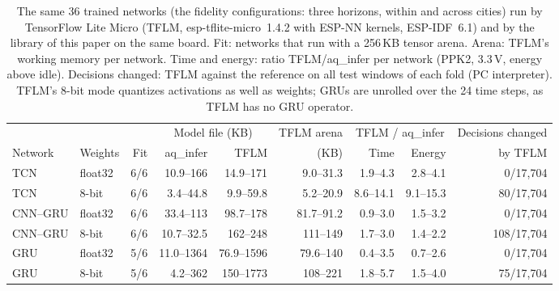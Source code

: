 \begin{table}[t]
\centering
\caption{The same 36 trained networks (the fidelity configurations: three horizons, within and across cities) run by TensorFlow Lite Micro (TFLM, esp-tflite-micro~1.4.2 with ESP-NN kernels, ESP-IDF~6.1) and by the library of this paper on the same board. Fit: networks that run with a 256\,KB tensor arena. Arena: TFLM's working memory per network. Time and energy: ratio TFLM/aq\_infer per network (PPK2, 3.3\,V, energy above idle). Decisions changed: TFLM against the reference on all test windows of each fold (PC interpreter). TFLM's 8-bit mode quantizes activations as well as weights; GRUs are unrolled over the 24 time steps, as TFLM has no GRU operator.}
\label{tab:tflm}
\footnotesize
\setlength{\tabcolsep}{4pt}
\begin{tabular}{llrrrrrrr}
\toprule
 & & & \multicolumn{2}{c}{Model file (KB)} & TFLM arena & \multicolumn{2}{c}{TFLM / aq\_infer} & Decisions changed \\
\cmidrule(lr){4-5}\cmidrule(lr){7-8}
Network & Weights & Fit & aq\_infer & TFLM & (KB) & Time & Energy & by TFLM \\
\midrule
TCN & float32 & 6/6 & 10.9--166 & 14.9--171 & 9.0--31.3 & 1.9--4.3 & 2.8--4.1 & 0/17{,}704 \\
TCN & 8-bit & 6/6 & 3.4--44.8 & 9.9--59.8 & 5.2--20.9 & 8.6--14.1 & 9.1--15.3 & 80/17{,}704 \\
CNN--GRU & float32 & 6/6 & 33.4--113 & 98.7--178 & 81.7--91.2 & 0.9--3.0 & 1.5--3.2 & 0/17{,}704 \\
CNN--GRU & 8-bit & 6/6 & 10.7--32.5 & 162--248 & 111--149 & 1.7--3.0 & 1.4--2.2 & 108/17{,}704 \\
GRU & float32 & 5/6 & 11.0--1364 & 76.9--1596 & 79.6--140 & 0.4--3.5 & 0.7--2.6 & 0/17{,}704 \\
GRU & 8-bit & 5/6 & 4.2--362 & 150--1773 & 108--221 & 1.8--5.7 & 1.5--4.0 & 75/17{,}704 \\
\bottomrule
\end{tabular}
\end{table}
